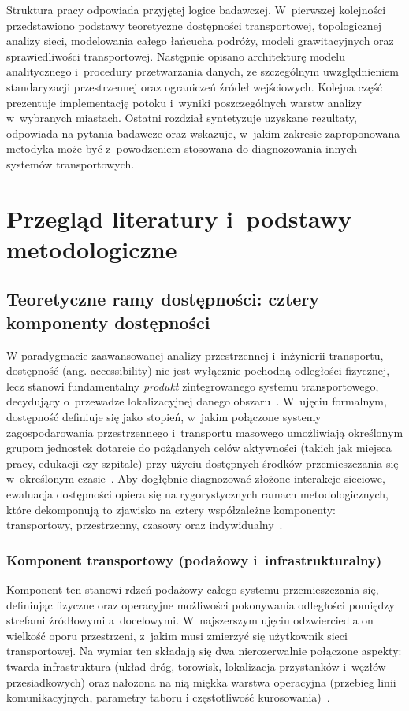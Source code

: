 \documentclass{pracamgr}
\begin{document}
Struktura pracy odpowiada przyjętej logice badawczej. W~pierwszej kolejności przedstawiono podstawy teoretyczne dostępności transportowej, topologicznej analizy sieci, modelowania całego łańcucha podróży, modeli grawitacyjnych oraz sprawiedliwości transportowej. Następnie opisano architekturę modelu analitycznego i~procedury przetwarzania danych, ze szczególnym uwzględnieniem standaryzacji przestrzennej oraz ograniczeń źródeł wejściowych. Kolejna część prezentuje implementację potoku i~wyniki poszczególnych warstw analizy w~wybranych miastach. Ostatni rozdział syntetyzuje uzyskane rezultaty, odpowiada na pytania badawcze oraz wskazuje, w~jakim zakresie zaproponowana metodyka może być z~powodzeniem stosowana do diagnozowania innych systemów transportowych.


\chapter{Przegląd literatury i~podstawy metodologiczne}\label{chapter:literatura}

\section{Teoretyczne ramy dostępności: cztery komponenty dostępności}\label{section:komponenty}

W paradygmacie zaawansowanej analizy przestrzennej i~inżynierii transportu, dostępność (ang. accessibility) nie jest wyłącznie pochodną odległości fizycznej, lecz stanowi fundamentalny \textit{produkt} zintegrowanego systemu transportowego, decydujący o~przewadze lokalizacyjnej danego obszaru~\cite{turon_sierpinski_2019}. W~ujęciu formalnym, dostępność definiuje się jako stopień, w~jakim połączone systemy zagospodarowania przestrzennego i~transportu masowego umożliwiają określonym grupom jednostek dotarcie do pożądanych celów aktywności (takich jak miejsca pracy, edukacji czy szpitale) przy użyciu dostępnych środków przemieszczania się w~określonym czasie~\cite{capetown}. Aby dogłębnie diagnozować złożone interakcje sieciowe, ewaluacja dostępności opiera się na rygorystycznych ramach metodologicznych, które dekomponują to zjawisko na cztery współzależne komponenty: transportowy, przestrzenny, czasowy oraz indywidualny~\cite{gravity2, literature_review}.

\subsection{Komponent transportowy (podażowy i~infrastrukturalny)}\label{subsection:komponent_transportowy}
Komponent ten stanowi rdzeń podażowy całego systemu przemieszczania się, definiując fizyczne oraz operacyjne możliwości pokonywania odległości pomiędzy strefami źródłowymi a~docelowymi. W~najszerszym ujęciu odzwierciedla on wielkość oporu przestrzeni, z~jakim musi zmierzyć się użytkownik sieci transportowej. Na wymiar ten składają się dwa nierozerwalnie połączone aspekty: twarda infrastruktura (układ dróg, torowisk, lokalizacja przystanków i~węzłów przesiadkowych) oraz nałożona na nią miękka warstwa operacyjna (przebieg linii komunikacyjnych, parametry taboru i częstotliwość kurosowania)~\cite{mrt, l-space2, c-space}.
\end{document}
